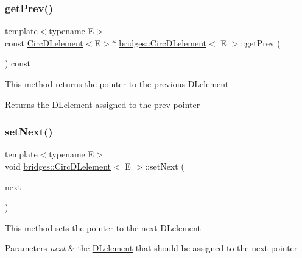 \subsubsection{\texorpdfstring{get\+Prev()}{getPrev()}}
{\footnotesize\ttfamily template$<$typename E$>$ \\
const \hyperlink{classbridges_1_1_circ_d_lelement}{Circ\+D\+Lelement}$<$E$>$$\ast$ \hyperlink{classbridges_1_1_circ_d_lelement}{bridges\+::\+Circ\+D\+Lelement}$<$ E $>$\+::get\+Prev (\begin{DoxyParamCaption}{ }\end{DoxyParamCaption}) const\hspace{0.3cm}{\ttfamily [inline]}}

This method returns the pointer to the previous \hyperlink{classbridges_1_1_d_lelement}{D\+Lelement} \begin{DoxyReturn}{Returns}
the \hyperlink{classbridges_1_1_d_lelement}{D\+Lelement} assigned to the prev pointer 
\end{DoxyReturn}
\hypertarget{classbridges_1_1_circ_d_lelement_a0bdf28de82173f2099673d18f6f62810}{}\label{classbridges_1_1_circ_d_lelement_a0bdf28de82173f2099673d18f6f62810} 
\subsubsection{\texorpdfstring{set\+Next()}{setNext()}}
{\footnotesize\ttfamily template$<$typename E$>$ \\
void \hyperlink{classbridges_1_1_circ_d_lelement}{bridges\+::\+Circ\+D\+Lelement}$<$ E $>$\+::set\+Next (\begin{DoxyParamCaption}\item[{\hyperlink{classbridges_1_1_circ_d_lelement}{Circ\+D\+Lelement}$<$ E $>$ $\ast$}]{next }\end{DoxyParamCaption})\hspace{0.3cm}{\ttfamily [inline]}}

This method sets the pointer to the next \hyperlink{classbridges_1_1_d_lelement}{D\+Lelement}


\begin{DoxyParams}{Parameters}
{\em next} & the \hyperlink{classbridges_1_1_d_lelement}{D\+Lelement} that should be assigned to the next pointer \\
\hline
\end{DoxyParams}
\hypertarget{classbridges_1_1_circ_d_lelement_a5b2a0dad47208829bb2c17d8bc0ee74d}{}\label{classbridges_1_1_circ_d_lelement_a5b2a0dad47208829bb2c17d8bc0ee74d} 
